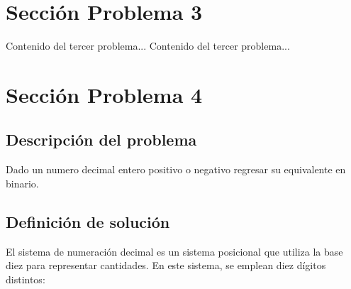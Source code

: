 \documentclass{IEEEcsmag}
\begin{document}
\section{Sección Problema 3}
Contenido del tercer problema...
\newpage 
Contenido del tercer problema...
\newpage 




































































\section{Sección Problema 4}
\subsection{Descripción del problema}
Dado un numero decimal entero positivo o negativo regresar su equivalente en binario.
\newline

\subsection{Definición de solución}

El sistema de numeración decimal es un sistema posicional que utiliza la base diez para representar cantidades. En este sistema, se emplean diez dígitos distintos:
\newline
\end{document}
